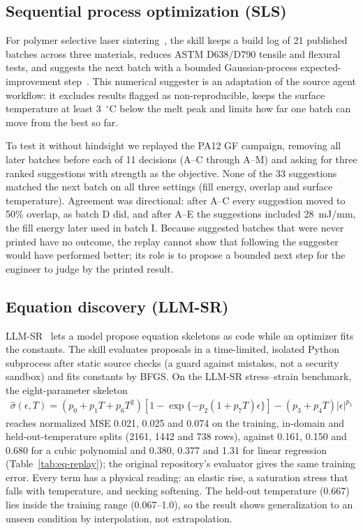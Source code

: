 \documentclass[11pt]{article}
\begin{document}
\subsection{Sequential process optimization (SLS)}
For polymer selective laser sintering~\cite{pak2026sls}, the skill keeps a build log of 21
published batches across three materials, reduces ASTM D638/D790 tensile and flexural tests, and
suggests the next batch with a bounded Gaussian-process expected-improvement step~\cite{jones1998ego}.
This numerical suggester is an adaptation of the source agent workflow: it excludes results flagged
as non-reproducible, keeps the surface temperature at least 3~$^\circ$C below the melt peak and
limits how far one batch can move from the best so far.

To test it without hindsight we replayed the PA12 GF campaign, removing all later batches before
each of 11 decisions (A--C through A--M) and asking for three ranked suggestions with strength as the
objective. None of the 33 suggestions matched the next batch on all three settings (fill energy,
overlap and surface temperature). Agreement was directional: after A--C every suggestion moved to
50\% overlap, as batch D did, and after A--E the suggestions included 28~mJ/mm, the fill energy
later used in batch I. Because suggested batches that were never printed have no outcome, the
replay cannot show that following the suggester would have performed better; its role is to propose
a bounded next step for the engineer to judge by the printed result.

\subsection{Equation discovery (LLM-SR)}
LLM-SR~\cite{shojaee2025llmsr} lets a model propose equation skeletons as code while an optimizer
fits the constants. The skill evaluates proposals in a time-limited, isolated Python subprocess
after static source checks (a guard against mistakes, not a security sandbox) and fits constants by
BFGS. On the LLM-SR stress--strain benchmark, the eight-parameter skeleton
\begin{align}
\hat\sigma(\epsilon,T)=(p_0+p_1T+p_6T^2)
\left[1-\exp\{-p_2(1+p_7T)\epsilon\}\right]-(p_3+p_4T)|\epsilon|^{p_5}
\end{align}
reaches normalized MSE 0.021, 0.025 and 0.074 on the training, in-domain and held-out-temperature
splits (2161, 1442 and 738 rows), against 0.161, 0.150 and 0.680 for a cubic polynomial and 0.380,
0.377 and 1.31 for linear regression (Table~\ref{tab:eq-replay}); the original repository's evaluator
gives the same training error. Every term has a physical reading: an elastic rise, a saturation
stress that falls with temperature, and necking softening. The held-out temperature (0.667) lies
inside the training range (0.067--1.0), so the result shows generalization to an unseen condition
by interpolation, not extrapolation.
\end{document}
